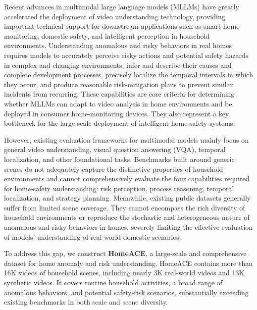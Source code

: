 \documentclass{article} %
\begin{document}
Recent advances in multimodal large language models (MLLMs) have greatly accelerated the deployment of video understanding technology, providing important technical support for downstream applications such as smart-home monitoring, domestic safety, and intelligent perception in household environments. Understanding anomalous and risky behaviors in real homes requires models to accurately perceive risky actions and potential safety hazards in complex and changing environments, infer and describe their causes and complete development processes, precisely localize the temporal intervals in which they occur, and produce reasonable risk-mitigation plans to prevent similar incidents from recurring. These capabilities are core criteria for determining whether MLLMs can adapt to video analysis in home environments and be deployed in consumer home-monitoring devices. They also represent a key bottleneck for the large-scale deployment of intelligent home-safety systems.

However, existing evaluation frameworks for multimodal models mainly focus on general video understanding, visual question answering (VQA), temporal localization, and other foundational tasks. Benchmarks built around generic scenes do not adequately capture the distinctive properties of household environments and cannot comprehensively evaluate the four capabilities required for home-safety understanding: risk perception, process reasoning, temporal localization, and strategy planning. Meanwhile, existing public datasets generally suffer from limited scene coverage. They cannot encompass the rich diversity of household environments or reproduce the stochastic and heterogeneous nature of anomalous and risky behaviors in homes, severely limiting the effective evaluation of models' understanding of real-world domestic scenarios.

To address this gap, we construct \textbf{HomeACE}, a large-scale and comprehensive dataset for home anomaly and risk understanding. HomeACE contains more than 16K videos of household scenes, including nearly 3K real-world videos and 13K synthetic videos. It covers routine household activities, a broad range of anomalous behaviors, and potential safety-risk scenarios, substantially exceeding existing benchmarks in both scale and scene diversity.
\end{document}
